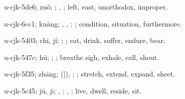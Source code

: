 \begin{multicols}{2}
{\cjkgGlue{}u-cjk-5de6; zuǒ; \cjkgGlue{}; \cjkgGlue{}, \cjkgGlue{}; left, east, unorthodox, improper.

\cjkgGlue{}u-cjk-6cc1; kuàng; \cjkgGlue{}\cjkgGlue{}\cjkgGlue{}, \cjkgGlue{}\cjkgGlue{}\cjkgGlue{}, \cjkgGlue{}; \cjkgGlue{}; condition, situation, furthermore.

\cjkgGlue{}u-cjk-5403; chī, jí; \cjkgGlue{}\cjkgGlue{}\cjkgGlue{}; \cjkgGlue{}; eat, drink, suffer, endure, bear.

\cjkgGlue{}u-cjk-547c; hū; \cjkgGlue{}\cjkgGlue{}\cjkgGlue{}; \cjkgGlue{}; breathe sigh, exhale, call, shout.

\cjkgGlue{}u-cjk-5f35; zhāng; \cjkgGlue{}\cjkgGlue{}(\cjkgGlue{}|\cjkgGlue{}), \cjkgGlue{}\cjkgGlue{}\cjkgGlue{}; \cjkgGlue{}; stretch, extend, expand, sheet.

\cjkgGlue{}u-cjk-5c45; jū, jī; \cjkgGlue{}\cjkgGlue{}\cjkgGlue{}, \cjkgGlue{}\cjkgGlue{}\cjkgGlue{}; \cjkgGlue{}, \cjkgGlue{}; live, dwell, reside, sit.

}
\end{multicols}
